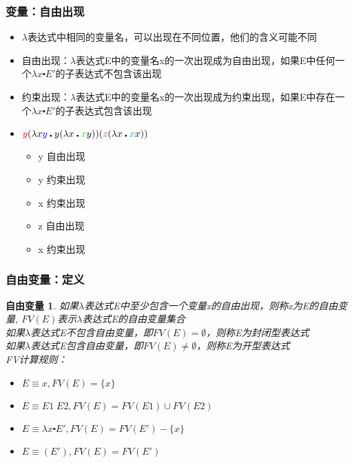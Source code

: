 \documentclass[CJK,compress,hyperref]{beamer}
\begin{document}
\begin{CJK}{UTF8}{song}
\begin{frame} 
  \frametitle{变量：自由出现}  
  \begin{itemize}
  \item $\lambda$表达式中相同的变量名，可以出现在不同位置，他们的含义可能不同
  \item 自由出现：$\lambda$表达式E中的变量名x的一次出现成为自由出现，如果E中任何一个$\lambda x \centerdot E'$的子表达式不包含该出现 
  \item 约束出现：$\lambda$表达式E中的变量名x的一次出现成为约束出现，如果E中存在一个$\lambda x \centerdot E'$的子表达式包含该出现 
  \item ${\color{red}y}(\lambda x {\color{blue}y} \centerdot
    y (\lambda x \centerdot {\color{green}x}y))
    ({\color{magenta}z} (\lambda x \centerdot {\color{cyan}x}x))$ 
    \begin{itemize} 
    \item {\color{red}y} 自由出现
    \item {\color{blue}y} 约束出现 
    \item {\color{green}x} 约束出现 
    \item {\color{magenta}z} 自由出现 
    \item {\color{cyan}x} 约束出现 
    \end{itemize} 
  \end{itemize}  
\end{frame}

\begin{frame}
  \frametitle{自由变量：定义} 
  \newtheorem{fv}{自由变量} 
  \begin{fv}
    如果$\lambda$表达式E中至少包含一个变量x的自由出现，则称x为E的{\color{red}自由变量}, $FV(E)$表示$\lambda$表达式E的自由变量集合 \\ 
    如果$\lambda$表达式E不包含自由变量，即$FV(E) = \emptyset$，则称E为封闭型表达式\\ 
    如果$\lambda$表达式E包含自由变量，即$FV(E) \neq \emptyset$，则称E为开型表达式 \\ 
    FV计算规则： 
    \begin{itemize} 
    \item  
      $E \equiv x , FV(E) = \{ x \}$
    \item       
      $E \equiv E1 \; E2,  FV(E) =  FV(E1) \cup FV(E2) $    
    \item
      $E \equiv \lambda x \centerdot E',  FV(E) =  FV(E')
      -\{ x \}     $
    \item
      $E \equiv (E'), FV(E) =  FV(E') $
    \end{itemize}
  \end{fv} 
\end{frame}


\end{CJK}
\end{document}
